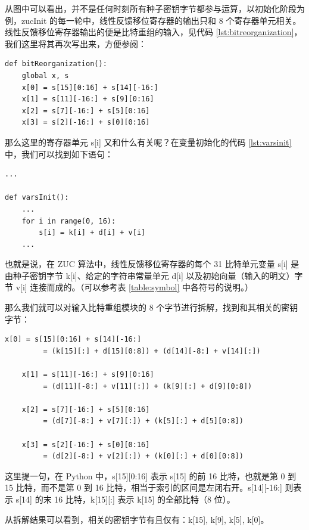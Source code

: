 \newpage

从图中可以看出，并不是任何时刻所有种子密钥字节都参与运算，以初始化阶段为例，{\cnsls zucInit} 的每一轮中，线性反馈移位寄存器的输出只和 8 个寄存器单元相关。线性反馈移位寄存器输出的便是比特重组的输入，见代码 \ref{lst:bitreorganization}，我们这里将其再次写出来，方便参阅：

\begin{lstlisting}[style=myPython]
def bitReorganization():
    global x, s
    x[0] = s[15][0:16] + s[14][-16:]
    x[1] = s[11][-16:] + s[9][0:16]
    x[2] = s[7][-16:] + s[5][0:16]
    x[3] = s[2][-16:] + s[0][0:16]
\end{lstlisting}

那么这里的寄存器单元 {\cnsls s[i]} 又和什么有关呢？在变量初始化的代码 \ref{lst:varsinit} 中，我们可以找到如下语句：

\begin{lstlisting}[style=myPython]
...

def varsInit():
    ...
    for i in range(0, 16):
        s[i] = k[i] + d[i] + v[i]
    ...
\end{lstlisting}

也就是说，在 ZUC 算法中，线性反馈移位寄存器的每个 31 比特单元变量 {\cnsls s[i]} 是由种子密钥字节 {\cnsls k[i]}、给定的字符串常量单元 {\cnsls d[i]} 以及初始向量（输入的明文）字节 {\cnsls v[i]} 连接而成的。（可以参考表 \ref{table:symbol} 中各符号的说明。）

那么我们就可以对输入比特重组模块的 8 个字节进行拆解，找到和其相关的密钥字节：

\begin{lstlisting}[style=myPython]
    x[0] = s[15][0:16] + s[14][-16:]
         = (k[15][:] + d[15][0:8]) + (d[14][-8:] + v[14][:])

    x[1] = s[11][-16:] + s[9][0:16]
         = (d[11][-8:] + v[11][:]) + (k[9][:] + d[9][0:8])

    x[2] = s[7][-16:] + s[5][0:16]
         = (d[7][-8:] + v[7][:]) + (k[5][:] + d[5][0:8])

    x[3] = s[2][-16:] + s[0][0:16]
         = (d[2][-8:] + v[2][:]) + (k[0][:] + d[0][0:8])
\end{lstlisting}

这里提一句，在 Python 中，{\cnsls s[15][0:16]} 表示 {\cnsls s[15]} 的前 16 比特，也就是第 0 到 15 比特，而不是第 0 到 16 比特，相当于索引的区间是左闭右开。{\cnsls s[14][-16:]} 则表示 {\cnsls s[14]} 的末 16 比特，{\cnsls k[15][:]} 表示 {\cnsls k[15]} 的全部比特（8 位）。

从拆解结果可以看到，相关的密钥字节有且仅有：{\cnsls k[15], k[9], k[5], k[0]}。

